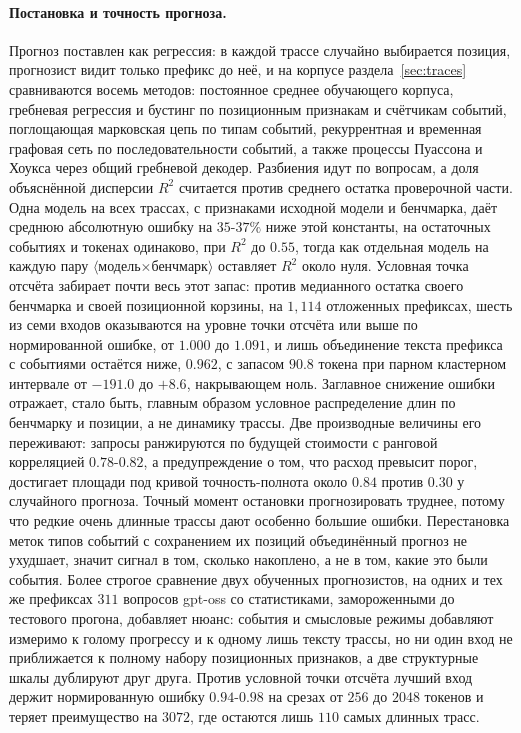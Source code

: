 \documentclass[11pt]{article}
\begin{document}
\paragraph{Постановка и точность прогноза.} Прогноз поставлен как регрессия: в каждой трассе случайно выбирается позиция, прогнозист видит только префикс до неё, и на корпусе раздела~\ref{sec:traces} сравниваются восемь методов: постоянное среднее обучающего корпуса, гребневая регрессия и бустинг по позиционным признакам и счётчикам событий, поглощающая марковская цепь по типам событий, рекуррентная и временная графовая сеть по последовательности событий, а также процессы Пуассона и Хоукса через общий гребневой декодер. Разбиения идут по вопросам, а доля объяснённой дисперсии $R^2$ считается против среднего остатка проверочной части. Одна модель на всех трассах, с признаками исходной модели и бенчмарка, даёт среднюю абсолютную ошибку на $35$-$37\%$ ниже этой константы, на остаточных событиях и токенах одинаково, при $R^2$ до $0.55$, тогда как отдельная модель на каждую пару $\langle$модель$\times$бенчмарк$\rangle$ оставляет $R^2$ около нуля. Условная точка отсчёта забирает почти весь этот запас: против медианного остатка своего бенчмарка и своей позиционной корзины, на $1{,}114$ отложенных префиксах, шесть из семи входов оказываются на уровне точки отсчёта или выше по нормированной ошибке, от $1.000$ до $1.091$, и лишь объединение текста префикса с событиями остаётся ниже, $0.962$, с запасом $90.8$ токена при парном кластерном интервале от $-191.0$ до $+8.6$, накрывающем ноль. Заглавное снижение ошибки отражает, стало быть, главным образом условное распределение длин по бенчмарку и позиции, а не динамику трассы. Две производные величины его переживают: запросы ранжируются по будущей стоимости с ранговой корреляцией $0.78$-$0.82$, а предупреждение о том, что расход превысит порог, достигает площади под кривой точность-полнота около $0.84$ против $0.30$ у случайного прогноза. Точный момент остановки прогнозировать труднее, потому что редкие очень длинные трассы дают особенно большие ошибки. Перестановка меток типов событий с сохранением их позиций объединённый прогноз не ухудшает, значит сигнал в том, сколько накоплено, а не в том, какие это были события. Более строгое сравнение двух обученных прогнозистов, на одних и тех же префиксах $311$ вопросов gpt-oss со статистиками, замороженными до тестового прогона, добавляет нюанс: события и смысловые режимы добавляют измеримо к голому прогрессу и к одному лишь тексту трассы, но ни один вход не приближается к полному набору позиционных признаков, а две структурные шкалы дублируют друг друга. Против условной точки отсчёта лучший вход держит нормированную ошибку $0.94$-$0.98$ на срезах от $256$ до $2048$ токенов и теряет преимущество на $3072$, где остаются лишь $110$ самых длинных трасс.
\end{document}
